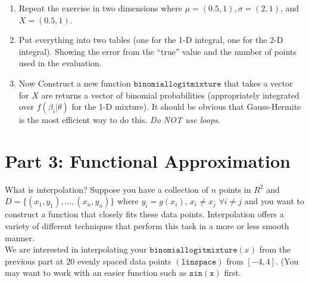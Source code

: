 \documentclass{article}
\begin{document}
\begin{enumerate}
\item Repeat the exercise in two dimensions where $\mu = (0.5,1), \sigma = (2,1)$, and $X=(0.5,1)$.
\item Put everything into two tables (one for the 1-D integral, one for the 2-D integral). Showing the error from the ``true'' value and the number of points used in the evaluation.
\begin{comment}
\begin{table}[htdp]
\caption{2-D Results True value: 0.7145}
\begin{center}
\begin{tabular}{l r r r }
Method & Points & Error\\
quad & n/a & 1e-14 \\
monte carlo & 100 &  0.0174\\
Gauss Hermite(PR) & 25 & 0.0250\\
SGI-GQN & 13 & 0.0091\\
SGI-KPN & 17 & -6.9355e-04\\
\end{tabular}
\end{center}
\end{table}%
\end{comment}
\item Now Construct a new function $\mathtt{binomiallogitmixture}$ that takes a vector for $X$ are returns a vector of binomial probabilities (appropriately integrated over $f(\beta_i | \theta)$ for the 1-D mixture). It should be obvious that Gauss-Hermite is the most efficient way to do this. \textit{Do NOT use loops}.
\end{enumerate}

\section*{Part 3: Functional Approximation}
What is interpolation? Suppose you have a collection of $n$ points in $R^2$ and $D=\{(x_1,y_1),\ldots,(x_n,y_n)\}$  where $y_i = g(x_i)$, $x_i \neq x_j$  $\forall i \neq j$ and you want to construct a function that closely fits these data points. Interpolation offers a variety of different techniques that perform this task in a more or less smooth manner.\\


We are interested in interpolating your $\mathtt{binomiallogitmixture}(x)$ from the previous part at 20 evenly spaced data points $(\mathtt{linspace})$ from $[-4,4]$. (You may want to work with an easier function such as $\mathtt{sin(x)}$ first.\\
\end{document}
